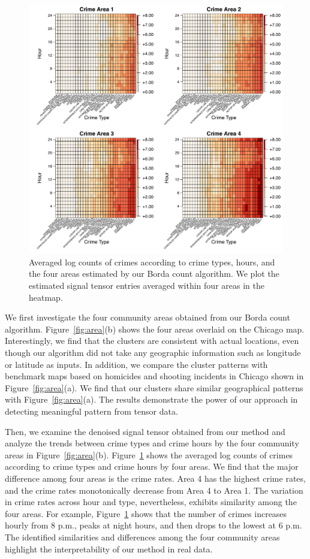 \documentclass[11pt]{article}
\theoremstyle{definition}
\begin{document}
\begin{figure}[ht!]
    \centering
    \includegraphics[width = \textwidth]{figure/CrimeA.pdf}
    \caption{Averaged log counts of crimes according to crime types, hours, and the four areas estimated by our Borda count algorithm. We plot the estimated signal tensor entries averaged within four areas in the heatmap.}
    \label{fig:crimeA}
\end{figure}

We first investigate the four community areas obtained from our Borda count algorithm.  Figure~\ref{fig:area}(b) shows the four areas overlaid on the Chicago map. Interestingly, we find that the clusters are consistent with actual locations, even though our algorithm did not take any geographic information such as longitude or latitude as inputs. In addition, we compare the cluster patterns with benchmark maps based on homicides and shooting incidents in Chicago shown in Figure~\ref{fig:area}(a). We find that our clusters share similar geographical patterns with Figure~\ref{fig:area}(a). The results demonstrate the power of our approach in detecting meaningful pattern from tensor data. 




Then, we examine the denoised signal tensor obtained from our method and analyze the trends between crime types and crime hours by the four community areas in Figure~\ref{fig:area}(b). Figure~\ref{fig:crimeA} shows the averaged log counts of crimes according to crime types and crime hours by four areas. We find that the major difference among four areas is the crime rates. Area 4 has the highest crime rates,  and the crime rates monotonically decrease from Area 4 to Area 1. The variation in crime rates across hour and type, nevertheless, exhibits similarity among the four areas. For example, Figure~\ref{fig:crimeA} shows that the number of crimes increases hourly from 8 p.m., peaks at night hours, and then drops to the lowest at 6 p.m. 
The identified similarities and differences among the four community areas highlight the interpretability of our method in real data.
\end{document}
